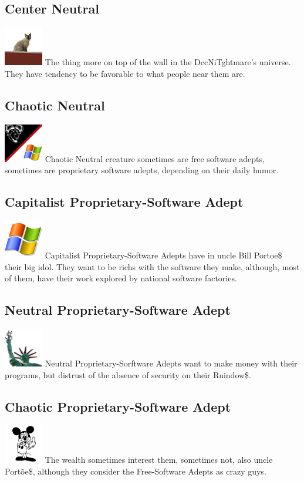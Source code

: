 \documentclass[ letterpaper,12pt]{article}
\begin{document}
\subsection{Center Neutral} \includegraphics{../data/alignment/Img/muro.png} The thing more on top of the wall in the DccNiTghtmare's universe.  They have tendency to be favorable to what people near them are.
\subsection{Chaotic Neutral} \includegraphics{../data/alignment/Img/yang.png} Chaotic Neutral creature sometimes are free software adepts, sometimes are proprietary software adepts, depending on their daily humor.
\subsection{Capitalist Proprietary-Software Adept}\includegraphics{../data/alignment/Img/ruindows.png} Capitalist Proprietary-Software Adepts have in uncle Bill Portoe\$ their big idol. They want to be richs with the software they make, although, most of them, have their work explored by national software factories.
\subsection{Neutral Proprietary-Software Adept} \includegraphics{../data/alignment/Img/cifrao.png} Neutral Proprietary-Sorftware Adepts want to make money with their programs, but distrust of the absence of security on their Ruindow\$.
\subsection{Chaotic Proprietary-Software Adept}\includegraphics{../data/alignment/Img/niquel.png} The wealth sometimes interest them, sometimes not, also uncle Portõe\$, although they consider the Free-Software Adepts as crazy guys.
\end{document}
